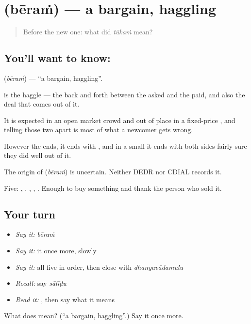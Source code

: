 \section[\texorpdfstring{\te{బేరం} (bēraṁ)}{బేరం (bēraṁ)}]{ (bēraṁ) — a bargain, haggling}

\label{lesson:TE-C72-bargain}



\begin{quote}
Before the new one: what did \emph{tūkaṁ} mean?
\end{quote}

\subsection*{You'll want to know: }
\textbf{} (\emph{bēraṁ}) — \textquotedblleft{}a bargain, haggling\textquotedblright{}.

 is the haggle — the back and forth between the  asked and the  paid, and also the deal that comes out of it.

It is expected in an open market crowd and out of place in a fixed-price , and telling those two apart is most of what a newcomer gets wrong.

However the  ends, it ends with , and in a small  it ends with both sides fairly sure they did well out of it.

\begin{cousinweb}
The origin of \textbf{} (\emph{bēraṁ}) is uncertain. Neither DEDR nor CDIAL records it.
\end{cousinweb}

\begin{grammarlens}[title={What you've built}]
Five: , , , , . Enough to buy something and thank the person who sold it.
\end{grammarlens}

\subsection*{Your turn}
\begin{itemize}
\raggedright
  \item \emph{Say it:} \emph{bēraṁ}
  \item \emph{Say it:} it once more, slowly
  \item \emph{Say it:} all five in order, then close with \emph{dhanyavādamulu}
  \item \emph{Recall:} say \emph{sālīḍu}
  \item \emph{Read it:} \textbf{}, then say what it means
\end{itemize}

\begin{tcolorbox}[breakable,colback=teal!4,colframe=teal!35!black,title={Before you move on}]
What does  mean? (\textquotedblleft{}a bargain, haggling\textquotedblright{}.) Say it once more.
\end{tcolorbox}
